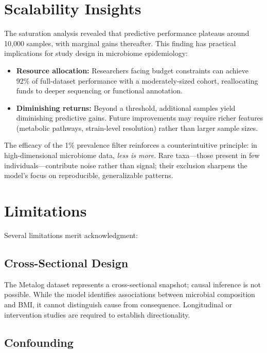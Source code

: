 \section{Scalability Insights}

The saturation analysis revealed that predictive performance plateaus around 10,000 samples, with marginal gains thereafter. This finding has practical implications for study design in microbiome epidemiology:

\begin{itemize}
    \item \textbf{Resource allocation:} Researchers facing budget constraints can achieve 92\% of full-dataset performance with a moderately-sized cohort, reallocating funds to deeper sequencing or functional annotation.
    \item \textbf{Diminishing returns:} Beyond a threshold, additional samples yield diminishing predictive gains. Future improvements may require richer features (metabolic pathways, strain-level resolution) rather than larger sample sizes.
\end{itemize}

The efficacy of the 1\% prevalence filter reinforces a counterintuitive principle: in high-dimensional microbiome data, \emph{less is more}. Rare taxa---those present in few individuals---contribute noise rather than signal; their exclusion sharpens the model's focus on reproducible, generalizable patterns.

\section{Limitations}

Several limitations merit acknowledgment:

\subsection{Cross-Sectional Design}

The Metalog dataset represents a cross-sectional snapshot; causal inference is not possible. While the model identifies associations between microbial composition and BMI, it cannot distinguish cause from consequence. Longitudinal or intervention studies are required to establish directionality.

\subsection{Confounding}

